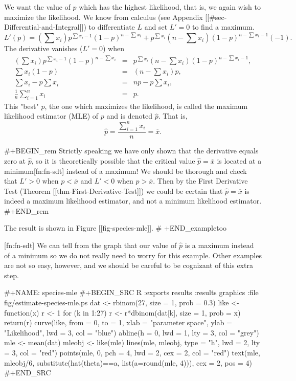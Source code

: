 We want the value of \(p\) which has the highest likelihood, that is,
we again wish to maximize the likelihood. We know from calculus (see
Appendix [[#sec-Differential-and-Integral]]) to differentiate \(L\)
and set \(L'=0\) to find a maximum.  \[ L'(p)=\left(\sum
x_{i}\right)p^{\sum x_{i}-1}(1-p)^{n-\sum x_{i}}+p^{\sum
x_{i}}\left(n-\sum x_{i}\right)(1-p)^{n-\sum x_{i}-1}(-1).  \] The
derivative vanishes (\(L'=0\)) when
\begin{eqnarray*}
\left(\sum x_{i}\right)p^{\sum x_{i}-1}(1-p)^{n-\sum x_{i}} & = & p^{\sum x_{i}}\left(n-\sum x_{i}\right)(1-p)^{n-\sum x_{i}-1},\\
\sum x_{i}(1-p) & = & \left(n-\sum x_{i}\right)p,\\
\sum x_{i}-p\sum x_{i} & = & np-p\sum x_{i},\\
\frac{1}{n}\sum_{i=1}^{n}x_{i} & = & p.
\end{eqnarray*}
This "best" \(p\), the one which maximizes the likelihood, is called
the maximum likelihood estimator (MLE) of \(p\) and is denoted
\(\hat{p}\). That is,
\begin{equation} 
\hat{p}=\frac{\sum_{i=1}^{n}x_{i}}{n}=\overline{x}.
\end{equation}

#+BEGIN_rem
Strictly speaking we have only shown that the derivative equals zero
at \(\hat{p}\), so it is theoretically possible that the critical
value \(\hat{p}=\overline{x}\) is located at a minimum[fn:fn-sdt]
instead of a maximum! We should be thorough and check that \(L'>0\)
when \(p<\overline{x}\) and \(L'<0\) when \(p>\overline{x}\). Then by
the First Derivative Test (Theorem [[thm-First-Derivative-Test]]) we could
be certain that \(\hat{p}=\overline{x}\) is indeed a maximum
likelihood estimator, and not a minimum likelihood estimator.
#+END_rem

The result is shown in Figure [[fig-species-mle]].
# +END_exampletoo

[fn:fn-sdt] We can tell from the graph that our value of \(\hat{p}\)
is a maximum instead of a minimum so we do not really need to worry
for this example. Other examples are not so easy, however, and we
should be careful to be cognizant of this extra step.

#+NAME: species-mle
#+BEGIN_SRC R :exports results :results graphics :file fig/estimate-species-mle.ps
dat <- rbinom(27, size = 1, prob = 0.3)
like <- function(x){
r <- 1
for (k in 1:27){ r <- r*dbinom(dat[k], size = 1, prob = x)}
return(r)
}
curve(like, from = 0, to = 1, xlab = "parameter space", ylab = "Likelihood", lwd = 3, col = "blue")
abline(h = 0, lwd = 1, lty = 3, col = "grey")
mle <- mean(dat)
mleobj <- like(mle)
lines(mle, mleobj, type = "h", lwd = 2, lty = 3, col = "red")
points(mle, 0, pch = 4, lwd = 2, cex = 2, col = "red")
text(mle, mleobj/6, substitute(hat(theta)==a, list(a=round(mle, 4))), cex = 2, pos = 4)
#+END_SRC

